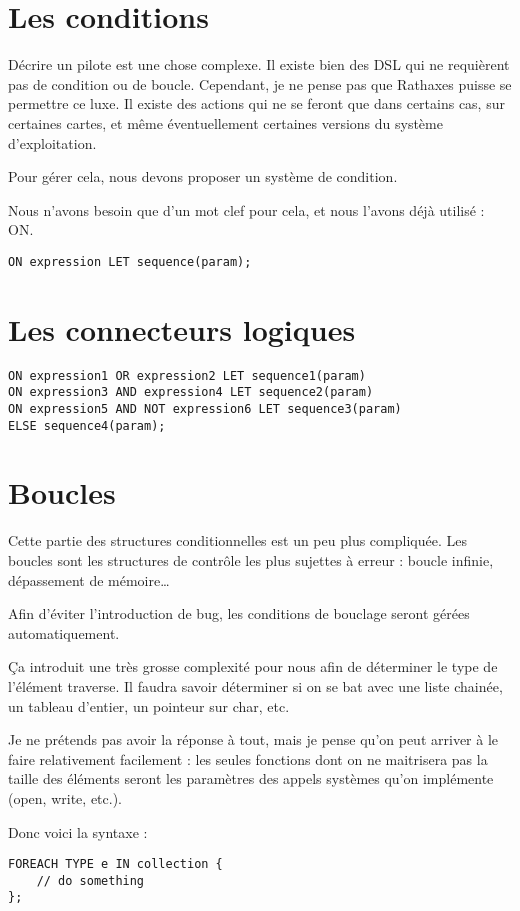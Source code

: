\documentclass{rtxreport}
\begin{document}
\section{Les conditions}
Décrire un pilote est une chose complexe. Il existe bien des DSL qui ne requièrent pas de condition ou de boucle. Cependant, je ne pense pas que Rathaxes puisse se permettre ce luxe. Il existe des actions qui ne se feront que dans certains cas, sur certaines cartes, et même éventuellement certaines versions du système d’exploitation.

Pour gérer cela, nous devons proposer un système de condition. 

Nous n’avons besoin que d’un mot clef pour cela, et nous l’avons déjà utilisé : ON.
\begin{lstlisting}
ON expression LET sequence(param);
\end{lstlisting}

\section{Les connecteurs logiques}
\begin{lstlisting}
ON expression1 OR expression2 LET sequence1(param)
ON expression3 AND expression4 LET sequence2(param)
ON expression5 AND NOT expression6 LET sequence3(param)
ELSE sequence4(param);
\end{lstlisting}

\section{Boucles}
Cette partie des structures conditionnelles est un peu plus compliquée. Les boucles sont les structures de contrôle les plus sujettes à erreur : boucle infinie, dépassement de mémoire\ldots

Afin d’éviter l’introduction de bug, les conditions de bouclage seront gérées automatiquement.

Ça introduit une très grosse complexité pour nous afin de déterminer le type de l’élément traverse. Il faudra savoir déterminer si on se bat avec une liste chainée, un tableau d’entier, un pointeur sur char, etc.

Je ne prétends pas avoir la réponse à tout, mais je pense qu’on peut arriver à le faire relativement facilement : les seules fonctions dont on ne maitrisera pas la taille des éléments seront les paramètres des appels systèmes qu’on implémente (open, write, etc.).

Donc voici la syntaxe :
\begin{lstlisting}
FOREACH TYPE e IN collection {
	// do something
};
\end{lstlisting}
\end{document}
